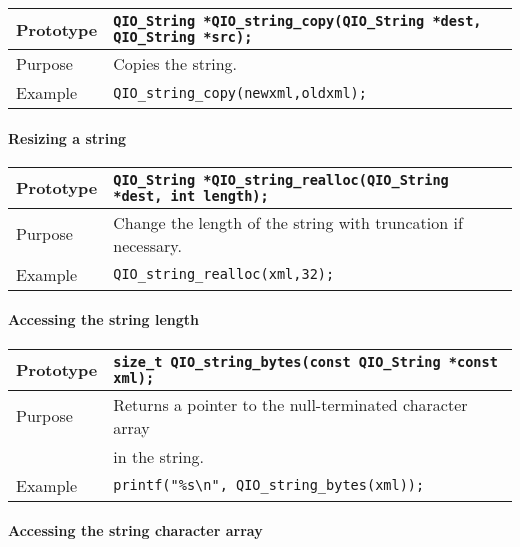\documentclass{article}
\newcommand{\QIOstring}{{\tt QIO\_String }}
\begin{document}
\begin{flushleft}
  \begin{tabular}{|l|l|}
  \hline
  Prototype      & \QIOstring \verb|*QIO_string_copy(|\QIOstring \verb|*dest,| \QIOstring \verb|*src);|\\
    \hline
  Purpose        & Copies the string. \\
   \hline
  Example        & \verb|QIO_string_copy(newxml,oldxml);| \\
   \hline
 \end{tabular}
\end{flushleft}
%

\paragraph{Resizing a string}

\begin{flushleft}
  \begin{tabular}{|l|l|}
  \hline
  Prototype      & \QIOstring \verb|*QIO_string_realloc(|\QIOstring \verb|*dest, int length);|\\
    \hline
  Purpose        & Change the length of the string with truncation if necessary. \\
   \hline
  Example        & \verb|QIO_string_realloc(xml,32);| \\
   \hline
 \end{tabular}
\end{flushleft}
%

\paragraph{Accessing the string length}

\begin{flushleft}
  \begin{tabular}{|l|l|}
  \hline
  Prototype      & \verb|size_t QIO_string_bytes(const |\QIOstring \verb|*const xml);|\\
    \hline
  Purpose        & Returns a pointer to the null-terminated character array \\
                 & in the string. \\
   \hline
  Example        & \verb|printf("%s\n", QIO_string_bytes(xml));| \\
   \hline
 \end{tabular}
\end{flushleft}
%
\paragraph{Accessing the string character array}
\end{document}
